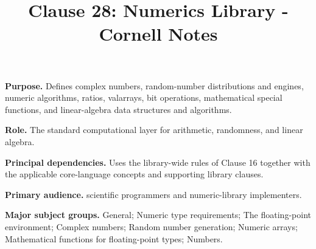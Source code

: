 \documentclass[11pt,letterpaper]{article}
\title{Clause 28: Numerics Library - Cornell Notes}
\author{}
\date{}
\begin{document}
\maketitle
\begin{CornellReferenceOrientationBox}
\textbf{Purpose.} Defines complex numbers, random-number distributions and engines, numeric algorithms, ratios, valarrays, bit operations, mathematical special functions, and linear-algebra data structures and algorithms.
\par\textbf{Role.} The standard computational layer for arithmetic, randomness, and linear algebra.
\par\textbf{Principal dependencies.} Uses the library-wide rules of Clause 16 together with the applicable core-language concepts and supporting library clauses.
\par\textbf{Primary audience.} scientific programmers and numeric-library implementers.
\par\textbf{Major subject groups.} General; Numeric type requirements; The floating-point environment; Complex numbers; Random number generation; Numeric arrays; Mathematical functions for floating-point types; Numbers.
\end{CornellReferenceOrientationBox}
\end{document}
